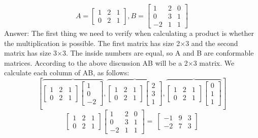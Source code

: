\documentclass{article}
\begin{document}
\begin{description}[style=nextline]
\item[Question 4: Find the product $AB$ if possible]
$$A = \left[ \begin{array}{ccc} 1 & 2 & 1 \\ 0 & 2 & 1 \end{array} \right], B = \left[ \begin{array}{rrr} 1 & 2 & 0 \\ 0 & 3 & 1 \\ -2 & 1 & 1 \end{array} \right]$$
Answer: The first thing we need to verify when calculating a product is whether the multiplication is possible. The first matrix has size 2×3 and the second matrix has size 3×3. The inside numbers are equal, so A and B are conformable matrices. According to the above discussion AB will be a 2×3 matrix. We calculate each column of AB, as follows:
$$\left[ \overbrace{\left[ \begin{array}{rrr} 1 & 2 & 1 \\ 0 & 2 & 1 \end{array} \right] \left[ \begin{array}{r} 1 \\ 0 \\ -2 \end{array} \right]}, \overbrace{\left[ \begin{array}{rrr} 1 & 2 & 1 \\ 0 & 2 & 1 \end{array} \right] \left[ \begin{array}{r} 2 \\ 3 \\ 1 \end{array} \right]}, \overbrace{\left[ \begin{array}{rrr} 1 & 2 & 1 \\ 0 & 2 & 1 \end{array} \right] \left[ \begin{array}{r} 0 \\ 1 \\ 1 \end{array} \right]} \right]$$
$$\left[ \begin{array}{rrr} 1 & 2 & 1 \\ 0 & 2 & 1 \end{array} \right] \left[ \begin{array}{rrr} 1 & 2 & 0 \\ 0 & 3 & 1 \\ -2 & 1 & 1 \end{array} \right] = \ \left[ \begin{array}{rrr} -1 & 9 & 3 \\ -2 & 7 & 3 \end{array} \right]$$


\end{description}
\end{document}
